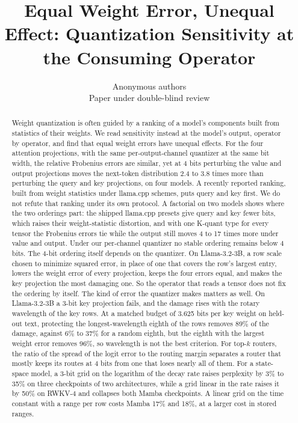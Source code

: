 \documentclass[10pt]{article}
\title{Equal Weight Error, Unequal Effect: Quantization Sensitivity at the Consuming Operator}
\author{\name Anonymous authors \\
      \addr Paper under double-blind review}
\begin{document}
\maketitle

\begin{abstract}
Weight quantization is often guided by a ranking of a model's components built from
statistics of their weights. We read sensitivity instead at the model's output, operator by operator, and find that
equal weight errors have unequal effects. For the four attention projections, with the same
per-output-channel quantizer at the same bit width, the relative Frobenius
errors are similar, yet at 4 bits perturbing the value and output
projections moves the next-token distribution 2.4 to 3.8 times more than perturbing the query
and key projections, on four models. A recently reported ranking, built from weight statistics
under llama.cpp schemes, puts query and key first. We do not refute that ranking under its own
protocol. A factorial on two models shows where the two orderings part: the shipped llama.cpp
presets give query and key fewer bits, which raises their weight-statistic distortion, and with
one K-quant type for every tensor the Frobenius errors tie while the output still moves 4 to 17
times more under value and output. Under our per-channel quantizer no stable ordering remains
below 4 bits. The 4-bit ordering itself depends on the quantizer. On Llama-3.2-3B, a row scale
chosen to minimize squared error, in place of one that covers the row's largest entry, lowers
the weight error of every projection, keeps the four errors equal, and makes the key projection
the most damaging one. So the operator that reads a tensor does not fix the ordering by itself.
The kind of error the quantizer makes matters as well. On Llama-3.2-3B a
3-bit key projection fails, and the damage rises with the rotary wavelength of the key rows. At a
matched budget of 3.625 bits per key weight on held-out text, protecting the longest-wavelength
eighth of the rows removes 89\% of the damage, against 6\% to 37\% for a random eighth, but the
eighth with the largest weight error removes 96\%, so wavelength is not the best criterion. For
top-$k$ routers, the ratio of the spread of the logit error to the routing margin separates a
router that mostly keeps its routes at 4 bits from one that loses nearly all of them. For a
state-space model, a 3-bit grid on the logarithm of the decay rate raises perplexity by 3\% to
35\% on three checkpoints of two architectures, while a grid linear in the rate raises it by
50\% on RWKV-4 and collapses both Mamba checkpoints. A linear grid on the time constant
with a range per row costs Mamba 17\% and 18\%, at a larger cost in stored ranges.
\end{abstract}
\end{document}
